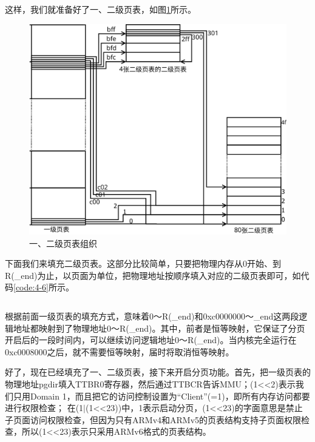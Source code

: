 \documentclass[main.tex]{subfiles}
\begin{document}
\begin{CJK*}{UTF8}{song}
这样，我们就准备好了一、二级页表，如图\ref{figure:4-6}所示。

\begin{figure}[htp]
\centering
\includegraphics[scale=0.3]{figures/4-6}
\caption{一、二级页表组织}
\label{figure:4-6}
\end{figure}

\par
下面我们来填充二级页表。这部分比较简单，只要把物理内存从0开始、到R(\_end)为止，以页面为单位，把物理地址按顺序填入对应的二级页表即可，如代码\ref{code:4-6}所示。

\begin{code}
\label{code:4-6}
\inputminted[firstline=187,lastline=193,linenos,numbersep=5pt,frame=lines,framesep=2mm]{c}{src/chapter04/kernel/machdep.c}
\end{code}

根据前面一级页表的填充方式，意味着0～R(\_end)和0xc0000000～\_end这两段逻辑地址都映射到了物理地址0～R(\_end)。其中，前者是恒等映射，它保证了分页开启后的一段时间内，可以继续访问逻辑地址0～R(\_end)。当内核完全运行在0xc0008000之后，就不需要恒等映射，届时将取消恒等映射。

\par
好了，现在已经填充了一、二级页表，接下来开启分页功能。首先，把一级页表的物理地址pgdir填入TTBR0寄存器，然后通过TTBCR告诉MMU；(1\textless\textless2)表示我们只用Domain 1，而且把它的访问控制设置为“Client”(=1)，即所有内存访问都要进行权限检查； 在(1$\mid$(1\textless\textless23))中，1表示启动分页，(1\textless\textless23)的字面意思是禁止子页面访问权限检查，但因为只有ARMv4和ARMv5的页表结构支持子页面权限检查，所以(1\textless\textless23)表示只采用ARMv6格式的页表结构。


\end{CJK*}
\end{document}
